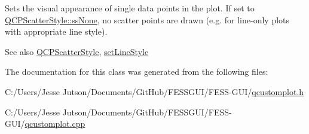 Sets the visual appearance of single data points in the plot. If set to \hyperlink{class_q_c_p_scatter_style_adb31525af6b680e6f1b7472e43859349abd144c291ca274f77053ec68cab6c022}{Q\+C\+P\+Scatter\+Style\+::ss\+None}, no scatter points are drawn (e.\+g. for line-\/only plots with appropriate line style).

\begin{DoxySeeAlso}{See also}
\hyperlink{class_q_c_p_scatter_style}{Q\+C\+P\+Scatter\+Style}, \hyperlink{class_q_c_p_curve_a4a377ec863ff81a1875c3094a6177c19}{set\+Line\+Style} 
\end{DoxySeeAlso}


The documentation for this class was generated from the following files\+:\begin{DoxyCompactItemize}
\item 
C\+:/\+Users/\+Jesse Jutson/\+Documents/\+Git\+Hub/\+F\+E\+S\+S\+G\+U\+I/\+F\+E\+S\+S-\/\+G\+U\+I/\hyperlink{qcustomplot_8h}{qcustomplot.\+h}\item 
C\+:/\+Users/\+Jesse Jutson/\+Documents/\+Git\+Hub/\+F\+E\+S\+S\+G\+U\+I/\+F\+E\+S\+S-\/\+G\+U\+I/\hyperlink{qcustomplot_8cpp}{qcustomplot.\+cpp}\end{DoxyCompactItemize}
